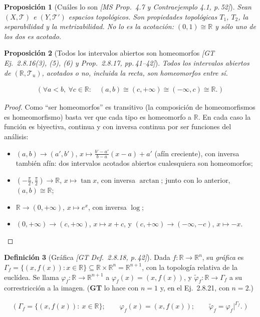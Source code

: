 \documentclass[11pt,a4paper]{article}
\newenvironment{lista}{\leavevmode\begin{itemize}[leftmargin=1.5em,itemsep=1pt,topsep=2pt,parsep=0pt]}{\end{itemize}}
\newcommand{\lgc}[1]{\par\vspace{-3pt}\begin{gather*}\big(\;#1\;\big)\end{gather*}\vspace{-6pt}}
\theoremstyle{definition}
\newtheorem{definicion}{Definición}[section]
\theoremstyle{plain}
\newtheorem{proposicion}[definicion]{Proposición}
\newcommand{\fnt}[1]{{\normalfont\small\itshape\color{gray!150!black}[#1]}}
\newcommand{\R}{\mathbb{R}}
\newcommand{\tp}{\mathcal{T}}
\begin{document}
\begin{proposicion}[Cuáles lo son \fnt{MS Prop.\ 4.7 y Contraejemplo 4.1, p.\,52}]
Sean $(X,\tp)$ e $(Y,\tp')$ espacios topológicos. Son propiedades topológicas $T_1$, $T_2$, la separabilidad y la metrizabilidad. \emph{No} lo es la acotación: $(0,1)\cong\R$ y sólo uno de los dos es acotado.
\end{proposicion}

\begin{proposicion}[Todos los intervalos abiertos son homeomorfos \fnt{GT Ej.\ 2.8.16(3), (5), (6) y Prop.\ 2.8.17, pp.\,41--42}]\label{hu:intabhomeo}
Todos los intervalos abiertos de $(\R,\tp_u)$, acotados o no, incluida la recta, son homeomorfos entre sí.
\lgc{\forall a<b,\ \forall c\in\R:\quad (a,b)\cong(c,+\infty)\cong(-\infty,c)\cong\R.}
\end{proposicion}

\begin{proof}
Como ``ser homeomorfos'' es transitivo (la composición de homeomorfismos es homeomorfismo) basta ver que cada tipo es homeomorfo a $\R$. En cada caso la función es biyectiva, continua y con inversa continua por ser funciones del análisis:
\begin{lista}
\item $(a,b)\to(a',b')$, $x\mapsto \frac{b'-a'}{b-a}(x-a)+a'$ (afín creciente), con inversa también afín: dos intervalos acotados abiertos cualesquiera son homeomorfos;
\item $(-\tfrac\pi2,\tfrac\pi2)\to\R$, $x\mapsto\tan x$, con inversa $\arctan$; junto con lo anterior, $(a,b)\cong\R$;
\item $\R\to(0,+\infty)$, $x\mapsto e^x$, con inversa $\log$;
\item $(0,+\infty)\to(c,+\infty)$, $x\mapsto x+c$, y $(c,+\infty)\to(-\infty,-c)$, $x\mapsto -x$.
\end{lista}
\end{proof}

\begin{definicion}[Gráfica \fnt{GT Def.\ 2.8.18, p.\,42}]
Dada $f:\R\to\R^n$, su \emph{gráfica} es $\Gamma_f=\{(x,f(x)): x\in\R\}\subseteq\R\times\R^n=\R^{n+1}$, con la topología relativa de la euclídea. Se llama $\varphi_f:\R\to\R^{n+1}$ a $\varphi_f(x)=(x,f(x))$, y $\widetilde\varphi_f:\R\to\Gamma_f$ a su correstricción a la imagen. (\textbf{GT} lo hace con $n=1$ y, en el Ej.\ 2.8.21, con $n=2$.)
\lgc{\Gamma_f=\{(x,f(x)):\ x\in\R\};\qquad \varphi_f(x)=(x,f(x));\qquad \widetilde\varphi_f=\varphi_f|^{\Gamma_f}.}
\end{definicion}
\end{document}
